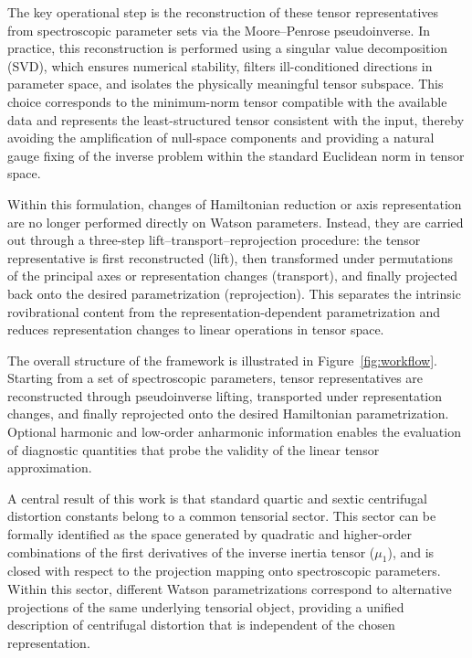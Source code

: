 \documentclass[aip,jcp,reprint,floatfix]{revtex4-2}
\begin{document}
The key operational step is the reconstruction of these tensor
representatives from spectroscopic parameter sets via the
Moore--Penrose pseudoinverse.
\cite{Penrose1955}
In practice, this reconstruction is performed using a singular value
decomposition (SVD), which ensures numerical stability, filters
ill-conditioned directions in parameter space, and isolates the
physically meaningful tensor subspace. This choice corresponds to the
minimum-norm tensor compatible with the available data and represents
the least-structured tensor consistent with the input, thereby avoiding
the amplification of null-space components and providing a natural
gauge fixing of the inverse problem within the standard Euclidean norm
in tensor space.

Within this formulation, changes of Hamiltonian reduction or axis
representation are no longer performed directly on Watson parameters.
Instead, they are carried out through a three-step
lift--transport--reprojection procedure: the tensor representative is
first reconstructed (lift), then transformed under permutations of the
principal axes or representation changes (transport), and finally
projected back onto the desired parametrization (reprojection). This
separates the intrinsic rovibrational content from the
representation-dependent parametrization and reduces representation
changes to linear operations in tensor space.

The overall structure of the framework is illustrated in
Figure~\ref{fig:workflow}. Starting from a set of spectroscopic
parameters, tensor representatives are reconstructed through
pseudoinverse lifting, transported under representation changes, and
finally reprojected onto the desired Hamiltonian parametrization.
Optional harmonic and low-order anharmonic information enables the evaluation of diagnostic
quantities that probe the validity of the linear tensor approximation.



A central result of this work is that standard quartic and sextic
centrifugal distortion constants belong to a common tensorial sector.
This sector can be formally identified as the space generated by
quadratic and higher-order combinations of the first derivatives of
the inverse inertia tensor ($\mu_1$), and is closed with respect to the
projection mapping onto spectroscopic parameters. Within this sector,
different Watson parametrizations correspond to alternative projections
of the same underlying tensorial object, providing a unified description
of centrifugal distortion that is independent of the chosen representation.
\end{document}
